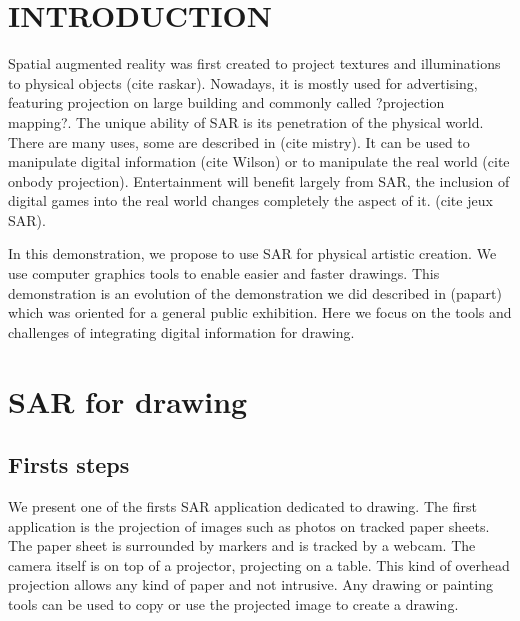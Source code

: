 \documentclass{article}
\begin{document}




\section{INTRODUCTION}

Spatial augmented reality was first created to project textures and illuminations to physical objects (cite raskar). Nowadays, it is mostly used for advertising, featuring projection on large building and commonly called ?projection mapping?. 
The unique ability of SAR is its penetration of the physical world. There are many uses, some are described in (cite mistry). It can be used to manipulate digital information (cite Wilson) or to manipulate the real world (cite onbody projection). Entertainment will benefit largely from SAR, the inclusion of digital games into the real world changes completely the aspect of it. (cite jeux SAR). 

In this demonstration, we propose to use SAR for physical artistic creation. We use computer graphics tools to enable easier and faster drawings. This demonstration is an evolution of the demonstration we did described in (papart) which was oriented for a general public exhibition. Here we focus on the tools and challenges of integrating digital information for drawing.  


\section{SAR for drawing}
\subsection{Firsts steps}

We present one of the firsts SAR application dedicated to drawing. The first application is the projection of images such as photos on tracked paper sheets. The paper sheet is surrounded by markers and is tracked by a webcam. The camera itself is on top of a projector, projecting on a table. This kind of overhead projection allows any kind of paper and not intrusive. Any drawing or painting tools can be used to  copy or use the projected image to create a drawing. 
 
\end{document}
